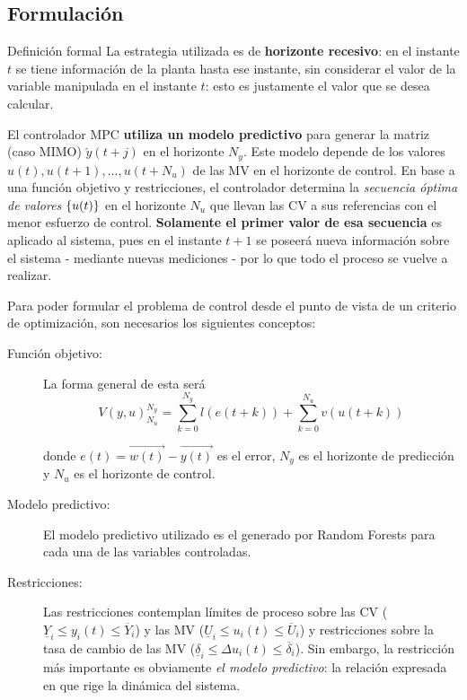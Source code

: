 \documentclass{beamer}
\begin{document}
\subsection{Formulación}
\begin{myFrame}{Definición formal}
La estrategia utilizada es de \textbf{horizonte recesivo}: en el instante $t$ se tiene información de la planta hasta ese instante, sin considerar el valor de la variable manipulada en el instante $t$: esto es justamente el valor que se desea calcular. 

El controlador MPC \textbf{utiliza un modelo predictivo} para generar la matriz (caso MIMO) $\hat{y}(t+j)$ en el horizonte $N_y$. Este modelo depende de los valores $u(t),u(t+1),...,u(t+N_u)$ de las MV en el horizonte de control. En base a una función objetivo y restricciones, el controlador determina la \emph{secuencia óptima de valores} $\squig{u(t)}$ en el horizonte $N_u$ que llevan las CV a sus referencias con el menor esfuerzo de control. \textbf{Solamente el primer valor de esa secuencia} es aplicado al sistema, pues en el instante $t+1$ se poseerá nueva información sobre el sistema - mediante nuevas mediciones - por lo que todo el proceso se vuelve a realizar.
\framebreak

Para poder formular el problema de control desde el punto de vista de un criterio de optimización, son necesarios los siguientes conceptos:
\begin{description}
\item[Función objetivo:] 
La forma general de esta será
\begin{equation}\label{eq:funcObj}
V(y,u)^{N_y}_{N_u} = \sum_{k = 0}^{N_y}l(e(t+k))+\sum_{k = 0}^{N_u}v(u(t+k))
\end{equation}

donde $e(t) = \vec{w(t)}-\vec{y(t)}$ es el error, $N_y$ es el horizonte de predicción y $N_u$ es el horizonte de control. 

\framebreak
\item[Modelo predictivo:] El modelo predictivo utilizado es el generado por Random Forests para cada una de las variables controladas. 

\item[Restricciones:] Las restricciones  contemplan límites de proceso sobre las CV ($\underline{Y}_i \leq y_i(t) \leq \overline{Y}_i$) y las MV ($\underline{U}_i \leq u_i(t) \leq \overline{U}_i$) y restricciones sobre la tasa de cambio de las MV ($\underline{\delta}_i \leq \Delta u_i(t) \leq \overline{\delta}_i$). Sin embargo, la restricción más importante es obviamente \emph{el modelo predictivo}: la relación expresada en  que rige la dinámica del sistema.
\end{description}


\end{myFrame}
\end{document}
